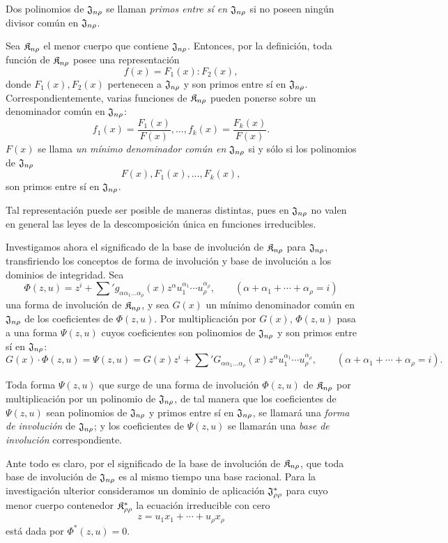 \documentclass[11pt]{article}
\begin{document}
Dos polinomios de $\mathfrak{J}_{n\rho}$ se llaman \emph{primos entre sí en $\mathfrak{J}_{n\rho}$} si no poseen ningún divisor común en $\mathfrak{J}_{n\rho}$.

Sea $\mathfrak{K}_{n\rho}$ el menor cuerpo que contiene $\mathfrak{J}_{n\rho}$. Entonces, por la definición, toda función de $\mathfrak{K}_{n\rho}$ posee una representación
\[
  f(x)=F_1(x):F_2(x),
\]
donde $F_1(x),F_2(x)$ pertenecen a $\mathfrak{J}_{n\rho}$ y son primos entre sí en $\mathfrak{J}_{n\rho}$. Correspondientemente, varias funciones de $\mathfrak{K}_{n\rho}$ pueden ponerse sobre un denominador común en $\mathfrak{J}_{n\rho}$:
\[
  f_1(x)=\frac{F_1(x)}{F(x)},\ldots,
  f_k(x)=\frac{F_k(x)}{F(x)}.
\]
$F(x)$ se llama \emph{un mínimo denominador común en $\mathfrak{J}_{n\rho}$} si y sólo si los polinomios de $\mathfrak{J}_{n\rho}$
\[
  F(x),F_1(x),\ldots,F_k(x),
\]
son primos entre sí en $\mathfrak{J}_{n\rho}$.

Tal representación puede ser posible de maneras distintas, pues en $\mathfrak{J}_{n\rho}$ no valen en general las leyes de la descomposición única en funciones irreducibles.

Investigamos ahora el significado de la base de involución de $\mathfrak{K}_{n\rho}$ para $\mathfrak{J}_{n\rho}$, transfiriendo los conceptos de forma de involución y base de involución a los dominios de integridad. Sea
\[
  \Phi(z,u)=z^i+\sum{}' g_{\alpha\alpha_1\ldots\alpha_\rho}(x)
  z^\alpha u_1^{\alpha_1}\cdots u_\rho^{\alpha_\rho},
  \qquad
  (\alpha+\alpha_1+\cdots+\alpha_\rho=i)
\]
una forma de involución de $\mathfrak{K}_{n\rho}$, y sea $G(x)$ un mínimo denominador común en $\mathfrak{J}_{n\rho}$ de los coeficientes de $\Phi(z,u)$. Por multiplicación por $G(x)$, $\Phi(z,u)$ pasa a una forma $\Psi(z,u)$ cuyos coeficientes son polinomios de $\mathfrak{J}_{n\rho}$ y son primos entre sí en $\mathfrak{J}_{n\rho}$:
\[
  G(x)\cdot\Phi(z,u)=\Psi(z,u)
  =G(x)z^i+
  \sum{}' G_{\alpha\alpha_1\ldots\alpha_\rho}(x)
  z^\alpha u_1^{\alpha_1}\cdots u_\rho^{\alpha_\rho},
  \qquad
  (\alpha+\alpha_1+\cdots+\alpha_\rho=i).
\]

Toda forma $\Psi(z,u)$ que surge de una forma de involución $\Phi(z,u)$ de $\mathfrak{K}_{n\rho}$ por multiplicación por un polinomio de $\mathfrak{J}_{n\rho}$, de tal manera que los coeficientes de $\Psi(z,u)$ sean polinomios de $\mathfrak{J}_{n\rho}$ y primos entre sí en $\mathfrak{J}_{n\rho}$, se llamará una \emph{forma de involución} de $\mathfrak{J}_{n\rho}$; y los coeficientes de $\Psi(z,u)$ se llamarán una \emph{base de involución} correspondiente.

Ante todo es claro, por el significado de la base de involución de $\mathfrak{K}_{n\rho}$, que toda base de involución de $\mathfrak{J}_{n\rho}$ es al mismo tiempo una base racional. Para la investigación ulterior consideramos un dominio de aplicación $\mathfrak{J}^*_{\rho\rho}$ para cuyo menor cuerpo contenedor $\mathfrak{K}^*_{\rho\rho}$ la ecuación irreducible con cero
\[
  z=u_1x_1+\cdots+u_\rho x_\rho
\]
está dada por $\Phi^*(z,u)=0$.
\end{document}
